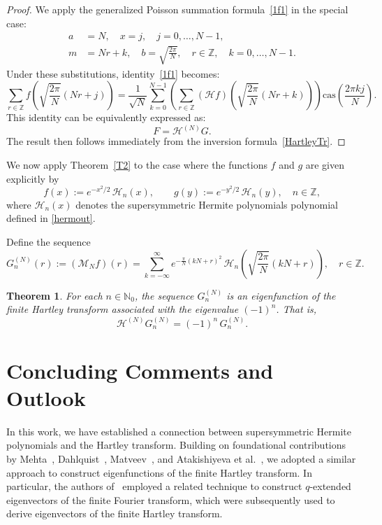 \documentclass[12 pt]{amsart}
\numberwithin{equation}{section}
\newtheorem{theorem}{Theorem}[section]
\begin{document}
\begin{proof}
We apply the generalized Poisson summation formula~\eqref{1f1} in the special case:
\[
\begin{aligned}
a &= N, \quad x = j, \quad j = 0, \dots, N-1, \\
m &= Nr + k, \quad b = \sqrt{\frac{2\pi}{N}}, \quad r \in \mathbb{Z}, \quad k = 0, \dots, N-1.
\end{aligned}
\]
Under these substitutions, identity~\eqref{1f1} becomes:
\begin{equation*}
\sum_{r \in \mathbb{Z}} f\left( \sqrt{\frac{2\pi}{N}}(Nr + j) \right)
= \frac{1}{\sqrt{N}} \sum_{k = 0}^{N - 1}
\left(
\sum_{r \in \mathbb{Z}} (\mathscr{H}f)\left( \sqrt{\frac{2\pi}{N}}(Nr + k) \right)
\right) \mathrm{cas} \left( \frac{2\pi k j}{N} \right).
\end{equation*}
This identity can be equivalently expressed as:
\[
F= \mathcal{H}^{(N)} G.
\]
The result then follows immediately from the inversion formula~\eqref{HartleyTr}.
\end{proof}
We now apply Theorem~\ref{T2} to the case where the functions \( f \) and \( g \) are given explicitly by
\[
f(x) := e^{-x^2/2} \, \mathcal{H}_n(x), \qquad
g(y) := e^{-y^2/2} \, \mathcal{H}_n(y),\quad n\in \mathbb{Z},
\]
where \( \mathcal{H}_n(x) \) denotes the  supersymmetric Hermite polynomials polynomial defined in \eqref{hermout}.

Define the sequence
\begin{equation}\label{F16}
G_n^{(N)}(r) := (\mathscr{M}_N f)(r) = \sum_{k = -\infty}^{\infty} e^{-\frac{\pi}{N}(kN + r)^2}
\, \mathcal{H}_n\left( \sqrt{\frac{2\pi}{N}}(kN + r) \right),\quad r\in \mathbb{Z}.
\end{equation}

\begin{theorem}
For each \( n \in \mathbb{N}_0 \), the sequence \( G_n^{(N)} \) is an eigenfunction of the finite Hartley transform associated with the eigenvalue \( (-1)^n \). That is,
\begin{equation}\label{1e}
\mathcal{H}^{(N)} G_n^{(N)} = (-1)^n \, G_n^{(N)}.
\end{equation}
\end{theorem}
\section{Concluding Comments and Outlook}

In this work, we have established a connection between supersymmetric Hermite polynomials and the Hartley transform. Building on foundational contributions by Mehta~\cite{Mehta}, Dahlquist~\cite{Dahl}, Matveev~\cite{Matv}, and Atakishiyeva et al.~\cite{Ata,Koo}, we adopted a similar approach to construct eigenfunctions of the finite Hartley transform. In particular, the authors of~\cite{Koo} employed a related technique to construct $q$-extended eigenvectors of the finite Fourier transform, which were subsequently used to derive eigenvectors of the finite Hartley transform.
\end{document}
